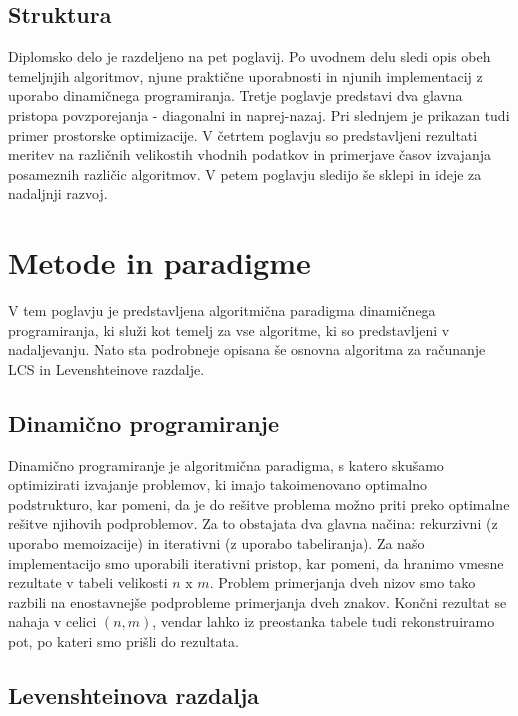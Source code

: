 \documentclass[a4paper,12pt,openright]{book}
\begin{document}
\section{Struktura}

Diplomsko delo je razdeljeno na pet poglavij. Po uvodnem delu sledi opis obeh temeljnjih algoritmov, njune praktične uporabnosti in njunih implementacij z uporabo dinamičnega programiranja. Tretje poglavje predstavi dva glavna pristopa povzporejanja - diagonalni in naprej-nazaj. Pri slednjem je prikazan tudi primer prostorske optimizacije. V četrtem poglavju so predstavljeni rezultati meritev na različnih velikostih vhodnih podatkov in primerjave časov izvajanja posameznih različic algoritmov. V petem poglavju sledijo še sklepi in ideje za nadaljnji razvoj. 

\chapter{Metode in paradigme}

V tem poglavju je predstavljena algoritmična paradigma dinamičnega programiranja, ki služi kot temelj za vse algoritme, ki so predstavljeni v nadaljevanju. Nato sta podrobneje opisana še osnovna algoritma za računanje LCS in Levenshteinove razdalje. 

\section{Dinamično programiranje}

Dinamično programiranje je algoritmična paradigma, s katero skušamo optimizirati izvajanje problemov, ki imajo takoimenovano optimalno podstrukturo, kar pomeni, da je do rešitve problema možno priti preko optimalne rešitve njihovih podproblemov. Za to obstajata dva glavna načina: rekurzivni (z uporabo memoizacije) in iterativni (z uporabo tabeliranja). Za našo implementacijo smo uporabili iterativni pristop, kar pomeni, da hranimo vmesne rezultate v tabeli velikosti \begin{math}n \text{ x } m\end{math}. Problem primerjanja dveh nizov smo tako razbili na enostavnejše podprobleme primerjanja dveh znakov. Končni rezultat se nahaja v celici \begin{math}(n,m)\end{math}, vendar lahko iz preostanka tabele tudi rekonstruiramo pot, po kateri smo prišli do rezultata. 


\section{Levenshteinova razdalja}
\end{document}

